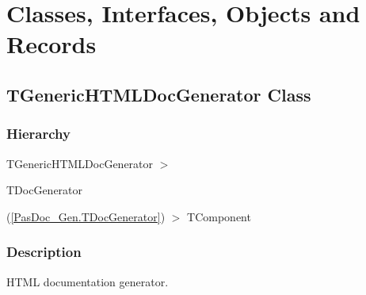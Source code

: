 \documentclass{report}
\newif\ifpdf
\begin{document}
\section{Classes, Interfaces, Objects and Records}
\ifpdf
\subsection*{\large{\textbf{TGenericHTMLDocGenerator Class}}\normalsize\hspace{1ex}\hrulefill}
\else
\subsection*{TGenericHTMLDocGenerator Class}
\fi
\label{PasDoc_GenHtml.TGenericHTMLDocGenerator}
\subsubsection*{\large{\textbf{Hierarchy}}\normalsize\hspace{1ex}\hfill}
TGenericHTMLDocGenerator {$>$} \begin{ttfamily}TDocGenerator\end{ttfamily}(\ref{PasDoc_Gen.TDocGenerator}) {$>$} 
TComponent
\subsubsection*{\large{\textbf{Description}}\normalsize\hspace{1ex}\hfill}
HTML documentation generator.\hfill\vspace*{1ex}
\end{document}
